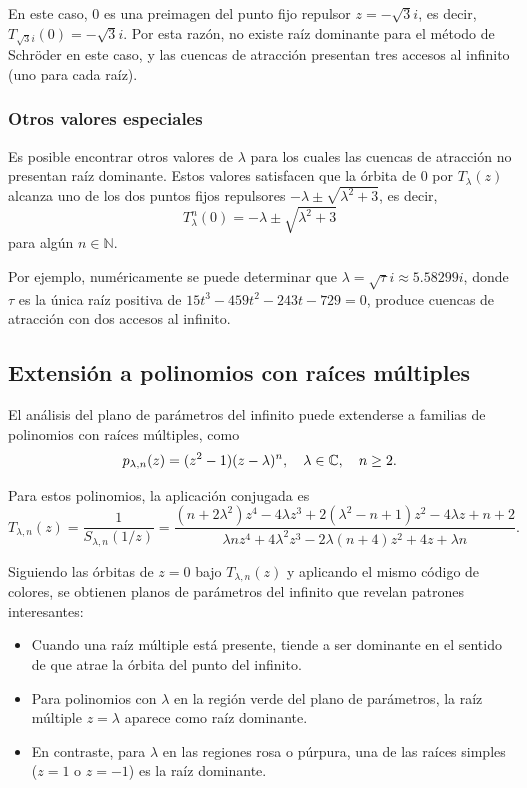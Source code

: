 En este caso, $0$ es una preimagen del punto fijo repulsor $z=-\sqrt{3}i$, es decir, $T_{\sqrt{3}i}(0)=-\sqrt{3}i$. Por esta razón, no existe raíz dominante para el método de Schröder en este caso, y las cuencas de atracción presentan tres accesos al infinito (uno para cada raíz).

\subsubsection{Otros valores especiales}

Es posible encontrar otros valores de $\lambda$ para los cuales las cuencas de atracción no presentan raíz dominante. Estos valores satisfacen que la órbita de $0$ por $T_\lambda(z)$ alcanza uno de los dos puntos fijos repulsores $-\lambda\pm\sqrt{\lambda^2+3}$, es decir,
$$
T^n_\lambda(0)=-\lambda\pm\sqrt{\lambda^2+3}
$$
para algún $n\in\mathbb{N}$.

Por ejemplo, numéricamente se puede determinar que $\lambda=\sqrt{\tau}i\approx 5.58299i$, donde $\tau$ es la única raíz positiva de $15t^3-459t^2-243t-729=0$, produce cuencas de atracción con dos accesos al infinito.

\subsection{Extensión a polinomios con raíces múltiples}

El análisis del plano de parámetros del infinito puede extenderse a familias de polinomios con raíces múltiples, como
\begin{equation}
p_{\lambda,n}(z)=(z^2-1)(z-\lambda)^n, \quad \lambda\in\mathbb{C}, \quad n\ge 2.
\label{eq:familia_mult_inf}
\end{equation}

Para estos polinomios, la aplicación conjugada es
\begin{equation}
T_{\lambda,n}(z)=\frac{1}{S_{\lambda,n}(1/z)}=\frac{(n+2\lambda^2)z^4-4\lambda z^3+2(\lambda^2-n+1)z^2-4\lambda z+n+2}{\lambda n z^4+4\lambda^2 z^3-2\lambda(n+4)z^2+4z+\lambda n}.
\label{eq:T_lambda_n_inf}
\end{equation}

Siguiendo las órbitas de $z=0$ bajo $T_{\lambda,n}(z)$ y aplicando el mismo código de colores, se obtienen planos de parámetros del infinito que revelan patrones interesantes:

\begin{itemize}
\item Cuando una raíz múltiple está presente, tiende a ser dominante en el sentido de que atrae la órbita del punto del infinito.
\item Para polinomios con $\lambda$ en la región verde del plano de parámetros, la raíz múltiple $z=\lambda$ aparece como raíz dominante.
\item En contraste, para $\lambda$ en las regiones rosa o púrpura, una de las raíces simples ($z=1$ o $z=-1$) es la raíz dominante.
\end{itemize}

